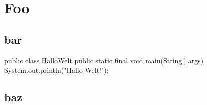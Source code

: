 \documentclass[utf,compactfonts]{uhb-inf}
\begin{document}
\section{Foo}
\blindtext[1]

\subsection{bar}
\blindtext[1]

\begin{Java}
	public class HalloWelt {
		public static final void main(String[] args) {
			System.out.println("Hallo Welt!");
		}
	}
\end{Java}

\subsection{baz}
\blinditemize

\blindtext[1]
\end{document}
